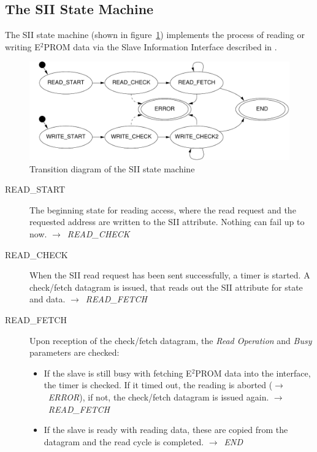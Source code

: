 \documentclass[a4paper,12pt,BCOR6mm,bibtotoc,idxtotoc]{scrbook}
\begin{document}

\subsection{The SII State Machine}
\label{sec:fsm-sii}

The SII state machine (shown in figure~\ref{fig:fsm-sii})
implements the process of reading or writing E$^2$PROM data via the
Slave Information Interface described in \cite[section~5.4]{alspec}.

\begin{figure}[htbp]
  \centering
  \includegraphics[width=.9\textwidth]{images/fsm-sii}
  \caption{Transition diagram of the SII state machine}
  \label{fig:fsm-sii}
\end{figure}

\begin{description}
\item[READ\_START] The beginning state for reading access, where the
  read request and the requested address are written to the SII
  attribute. Nothing can fail up to now.
  $\rightarrow$~\textit{READ\_CHECK}

\item[READ\_CHECK] When the SII read request has been sent
  successfully, a timer is started. A check/fetch datagram is issued,
  that reads out the SII attribute for state and data.
  $\rightarrow$~\textit{READ\_FETCH}

\item[READ\_FETCH] Upon reception of the check/fetch datagram, the
  \textit{Read Operation} and \textit{Busy} parameters are checked:
  \begin{itemize}
  \item If the slave is still busy with fetching E$^2$PROM data into
    the interface, the timer is checked. If it timed out, the reading
    is aborted ($\rightarrow$~\textit{ERROR}), if not, the check/fetch
    datagram is issued again. $\rightarrow$~\textit{READ\_FETCH}

  \item If the slave is ready with reading data, these are copied from
    the datagram and the read cycle is completed.
    $\rightarrow$~\textit{END}
  \end{itemize}
\end{description}
\end{document}
